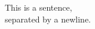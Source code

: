 \documentclass{article}
\begin{document}
This is a sentence,\\
separated by a newline.
\end{document}
